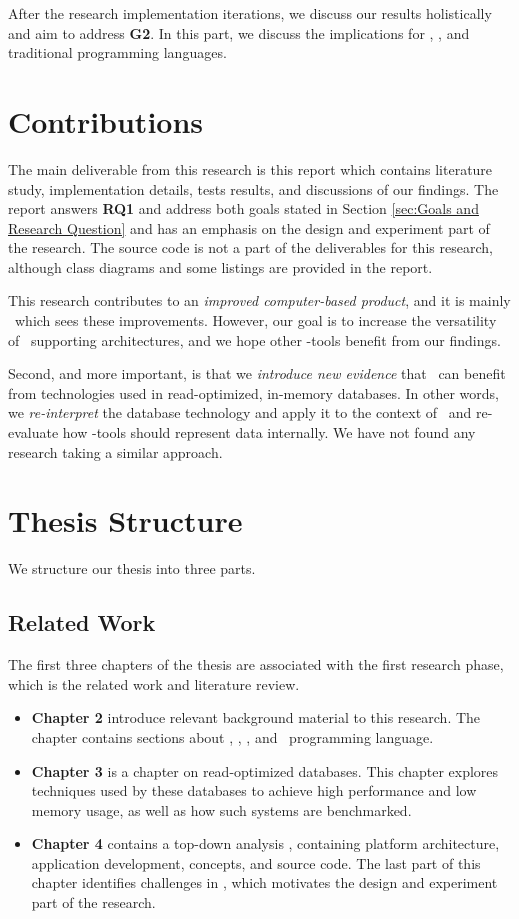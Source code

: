 After the research implementation iterations, we discuss our results holistically and aim to address \textbf{G2}. In this part, we discuss the implications for \gap, \mde, and traditional programming languages.

\section{Contributions}
\label{sec:Deliverables and Contributions}
The main deliverable from this research is this report which contains literature study, implementation details, tests results, and discussions of our findings. The report answers \textbf{RQ1} and address both goals stated in Section \ref{sec:Goals and Research Question} and has an emphasis on the design and experiment part of the research. The source code is not a part of the deliverables for this research, although class diagrams and some listings are provided in the report.

This research contributes to an \textit{improved computer-based product}, and it is mainly \gap~which sees these improvements. However, our goal is to increase the versatility of \mde~supporting architectures, and we hope other \mdd-tools benefit from our findings. 

Second, and more important, is that we \textit{introduce new evidence} that \mde~can benefit from technologies used in read-optimized, in-memory databases. In other words, we \textit{re-interpret} the database technology and apply it to the context of \mde~and re-evaluate how \mdd-tools should represent data internally. We have not found any research taking a similar approach. 

\section{Thesis Structure}
\label{sec:Thesis Structure}
We structure our thesis into three parts.

\subsection{Related Work}
\label{sub:Related Work}
The first three chapters of the thesis are associated with the first research phase, which is the related work and literature review.
\begin{itemize}
    \item \textbf{Chapter 2} introduce relevant background material to this research. The chapter contains sections about \mde, \bi, \bd, and \delphi~programming language.
    \item \textbf{Chapter 3} is a chapter on read-optimized databases. This chapter explores techniques used by these databases to achieve high performance and low memory usage, as well as how such systems are benchmarked. 
    \item \textbf{Chapter 4} contains a top-down analysis \gap, containing platform architecture, application development, concepts, and source code. The last part of this chapter identifies challenges in \gap, which motivates the design and experiment part of the research.
\end{itemize}

